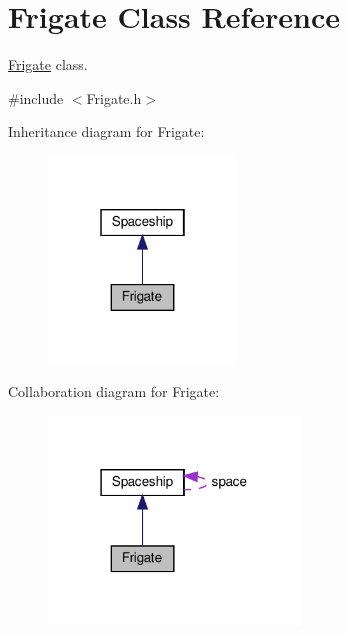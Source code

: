 \hypertarget{classFrigate}{}\section{Frigate Class Reference}
\label{classFrigate}


\hyperlink{classFrigate}{Frigate} class.  




{\ttfamily \#include $<$Frigate.\+h$>$}



Inheritance diagram for Frigate\+:\nopagebreak
\begin{figure}[H]
\begin{center}
\leavevmode
\includegraphics[width=142pt]{classFrigate__inherit__graph}
\end{center}
\end{figure}


Collaboration diagram for Frigate\+:\nopagebreak
\begin{figure}[H]
\begin{center}
\leavevmode
\includegraphics[width=190pt]{classFrigate__coll__graph}
\end{center}
\end{figure}
